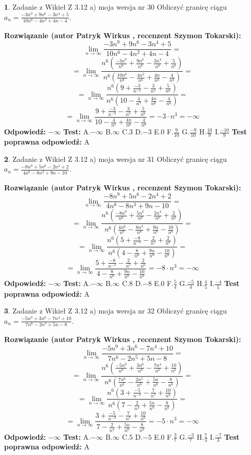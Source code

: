 \documentclass[12pt, a4paper]{article}
\theoremstyle{definition} %
\newtheorem{zad}{}
\newcommand{\zadStart}[1]{\begin{zad}#1\newline}
\newcommand{\zadStop}{\end{zad}}
\newcommand{\rozwStart}[2]{\noindent \textbf{Rozwiązanie (autor #1 , recenzent #2): }\newline}
\newcommand{\rozwStop}{\newline}
\newcommand{\odpStart}{\noindent \textbf{Odpowiedź:}\newline}
\newcommand{\odpStop}{\newline}
\newcommand{\testStart}{\noindent \textbf{Test:}\newline}
\newcommand{\testStop}{\newline}
\newcommand{\kluczStart}{\noindent \textbf{Test poprawna odpowiedź:}\newline}
\newcommand{\kluczStop}{\newline}
\begin{document}
\zadStart{Zadanie z Wikieł Z 3.12 a) moja wersja nr 30}
Obliczyć granicę ciągu $a_{n}=\frac{-3n^{9}+9n^{6}-3n^{4}+5}{10n^{6}-4n^{2}+4n-4}$.
\zadStop
\rozwStart{Patryk Wirkus}{Szymon Tokarski}
$$\lim\limits_{n\to\infty}\frac{-3n^{9}+9n^{6}-3n^{4}+5}{10n^{6}-4n^{2}+4n-4}=$$
$$=\lim\limits_{n\to\infty}\frac{n^{6}\left(\frac{-3n^{9}}{n^{6}}+\frac{9n^{6}}{n^{6}}-\frac{3n^{4}}{n^{6}}+\frac{5}{n^{6}}\right)}{n^{6}\left(\frac{10n^{6}}{n^{6}}-\frac{4n^{2}}{n^{6}}+\frac{4n}{n^{6}}-\frac{4}{n^{6}}\right)}=$$
$$=\lim\limits_{n\to\infty}\frac{n^{6}\left(9+\frac{-3}{n^{-3}}-\frac{3}{n^{5}}+\frac{5}{n^{6}}\right)}
{n^{6}\left(10-\frac{4}{n^{7}}+\frac{4n}{n^{6}}-\frac{4}{n^{6}}\right)}=$$
$$=\lim\limits_{n\to\infty}\frac{9+\frac{-3}{n^{-3}}-\frac{3}{n^{5}}+\frac{5}{n^{6}}}{10-\frac{4}{n^{7}}+\frac{4n}{n^{6}}-\frac{4}{n^{6}}}=-3\cdot n^{3} = -\infty$$
\rozwStop
\odpStart
$-\infty$
\odpStop
\testStart
A.$-\infty$
B.$\infty$
C.$3$
D.$-3$
E.$0$
F.$\frac{9}{10}$
G.$\frac{-9}{10}$
H.$\frac{10}{9}$
I.$\frac{-10}{9}$
\testStop
\kluczStart
A
\kluczStop



\zadStart{Zadanie z Wikieł Z 3.12 a) moja wersja nr 31}
Obliczyć granicę ciągu $a_{n}=\frac{-8n^{9}+5n^{6}-2n^{4}+2}{4n^{6}-8n^{3}+9n-10}$.
\zadStop
\rozwStart{Patryk Wirkus}{Szymon Tokarski}
$$\lim\limits_{n\to\infty}\frac{-8n^{9}+5n^{6}-2n^{4}+2}{4n^{6}-8n^{3}+9n-10}=$$
$$=\lim\limits_{n\to\infty}\frac{n^{6}\left(\frac{-8n^{9}}{n^{6}}+\frac{5n^{6}}{n^{6}}-\frac{2n^{4}}{n^{6}}+\frac{2}{n^{6}}\right)}{n^{6}\left(\frac{4n^{6}}{n^{6}}-\frac{8n^{3}}{n^{6}}+\frac{9n}{n^{6}}-\frac{10}{n^{6}}\right)}=$$
$$=\lim\limits_{n\to\infty}\frac{n^{6}\left(5+\frac{-8}{n^{-3}}-\frac{2}{n^{5}}+\frac{2}{n^{6}}\right)}
{n^{6}\left(4-\frac{8}{n^{6}}+\frac{9n}{n^{6}}-\frac{10}{n^{6}}\right)}=$$
$$=\lim\limits_{n\to\infty}\frac{5+\frac{-8}{n^{-3}}-\frac{2}{n^{5}}+\frac{2}{n^{6}}}{4-\frac{8}{n^{6}}+\frac{9n}{n^{6}}-\frac{10}{n^{6}}}=-8\cdot n^{3} = -\infty$$
\rozwStop
\odpStart
$-\infty$
\odpStop
\testStart
A.$-\infty$
B.$\infty$
C.$8$
D.$-8$
E.$0$
F.$\frac{5}{4}$
G.$\frac{-5}{4}$
H.$\frac{4}{5}$
I.$\frac{-4}{5}$
\testStop
\kluczStart
A
\kluczStop



\zadStart{Zadanie z Wikieł Z 3.12 a) moja wersja nr 32}
Obliczyć granicę ciągu $a_{n}=\frac{-5n^{9}+3n^{6}-7n^{4}+10}{7n^{6}-2n^{5}+5n-8}$.
\zadStop
\rozwStart{Patryk Wirkus}{Szymon Tokarski}
$$\lim\limits_{n\to\infty}\frac{-5n^{9}+3n^{6}-7n^{4}+10}{7n^{6}-2n^{5}+5n-8}=$$
$$=\lim\limits_{n\to\infty}\frac{n^{6}\left(\frac{-5n^{9}}{n^{6}}+\frac{3n^{6}}{n^{6}}-\frac{7n^{4}}{n^{6}}+\frac{10}{n^{6}}\right)}{n^{6}\left(\frac{7n^{6}}{n^{6}}-\frac{2n^{5}}{n^{6}}+\frac{5n}{n^{6}}-\frac{8}{n^{6}}\right)}=$$
$$=\lim\limits_{n\to\infty}\frac{n^{6}\left(3+\frac{-5}{n^{-3}}-\frac{7}{n^{5}}+\frac{10}{n^{6}}\right)}
{n^{6}\left(7-\frac{2}{n^{4}}+\frac{5n}{n^{6}}-\frac{8}{n^{6}}\right)}=$$
$$=\lim\limits_{n\to\infty}\frac{3+\frac{-5}{n^{-3}}-\frac{7}{n^{5}}+\frac{10}{n^{6}}}{7-\frac{2}{n^{4}}+\frac{5n}{n^{6}}-\frac{8}{n^{6}}}=-5\cdot n^{3} = -\infty$$
\rozwStop
\odpStart
$-\infty$
\odpStop
\testStart
A.$-\infty$
B.$\infty$
C.$5$
D.$-5$
E.$0$
F.$\frac{3}{7}$
G.$\frac{-3}{7}$
H.$\frac{7}{3}$
I.$\frac{-7}{3}$
\testStop
\kluczStart
A
\kluczStop
\end{document}
